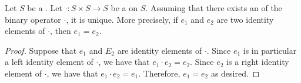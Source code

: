 \begin{lemma} \label{lemma:identity_element_of_a_binary_operation_on_a_set_is_unique_if_exists}
    Let $S$ be a . Let $\cdot: S \times S \to S$ be a  on $S$. Assuming that there exists an  of the binary operator $\cdot$, it is unique. More precisely, if $e_1$ and $e_2$ are two identity elements of $\cdot$, then $e_1 = e_2$.  
\end{lemma}
\begin{proof}
    Suppose that $e_1$ and $E_2$ are identity elements of $\cdot$. Since $e_1$ is in particular a left identity element of $\cdot$, we have that $e_1 \cdot e_2 = e_2$.  
    Since $e_2$ is a right identity element of $\cdot$, we have that $e_1 \cdot e_2 = e_1$. Therefore, $e_1 = e_2$ as desired.
\end{proof}